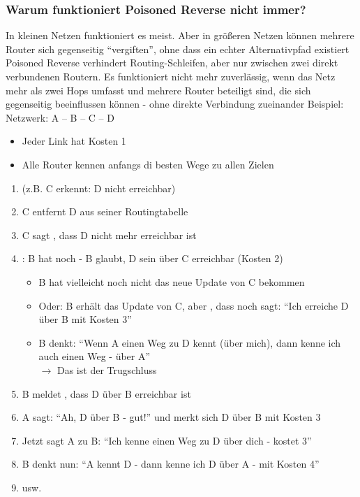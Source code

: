 \subsubsection*{Warum funktioniert Poisoned Reverse nicht immer?}
In kleinen Netzen funktioniert es meist. Aber in größeren Netzen können mehrere Router sich gegenseitig \enquote{vergiften}, ohne dass ein echter Alternativpfad existiert\\
Poisoned Reverse verhindert Routing-Schleifen, aber nur zwischen zwei direkt verbundenen Routern. Es funktioniert nicht mehr zuverlässig, wenn das Netz mehr als zwei Hops umfasst und mehrere Router beteiligt sind, die sich gegenseitig beeinflussen können - ohne direkte Verbindung zueinander
Beispiel:\\
Netzwerk: A -- B -- C -- D\\
\begin{itemize}
    \item Jeder Link hat Kosten 1
    \item Alle Router kennen anfangs di besten Wege zu allen Zielen
\end{itemize}
\begin{enumerate}
    \item {} (z.B. C erkennt: D nicht erreichbar)
    \item C entfernt D aus seiner Routingtabelle
    \item C sagt , dass D nicht mehr erreichbar ist
    \item {}: B hat noch  - B glaubt, D sein über C erreichbar (Kosten 2)
    \begin{itemize}
        \item B hat vielleicht noch nicht das neue Update von C bekommen
        \item Oder: B erhält das Update von C, aber , dass  noch sagt: \enquote{Ich erreiche D über B mit Kosten 3}
        \item B denkt: \enquote{Wenn A einen Weg zu D kennt (über mich), dann kenne ich auch einen Weg - über A}\\
        $\rightarrow$ Das ist der Trugschluss
    \end{itemize}
    \item B meldet , dass D über B erreichbar ist
    \item A sagt: \enquote{Ah, D über B - gut!} und merkt sich D über B mit Kosten 3
    \item Jetzt sagt A zu B: \enquote{Ich kenne einen Weg zu D über dich - kostet 3}
    \item B denkt nun: \enquote{A kennt D - dann kenne ich D über A - mit Kosten 4}
    \item usw.
\end{enumerate}
